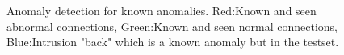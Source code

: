 \begin{figure}[htb2]
\begin{center}
\end{center}
\caption{Anomaly detection for known anomalies. Red:Known and seen abnormal connections, Green:Known and seen normal connections, Blue:Intrusion "back" which is a known anomaly but in the testset.} %
\label{fig:refSingleRobot1}

\end{figure}
